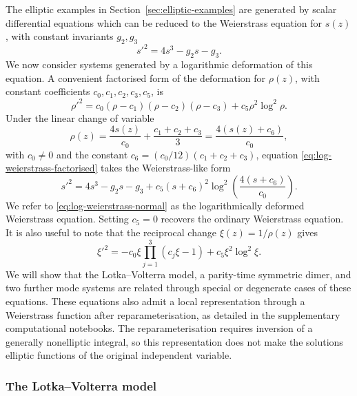 \documentclass[11pt,a4paper]{article}
\numberwithin{equation}{section}
\begin{document}
The elliptic examples in Section~\ref{sec:elliptic-examples} are generated by scalar differential equations which can be reduced to the Weierstrass equation for $s(z)$, with constant invariants $g_2,g_3$
\begin{equation}
    s'^2=4s^3-g_2s-g_3.
\end{equation}
We now consider systems generated by a logarithmic deformation of this equation. A convenient factorised form of the deformation for $\rho(z)$, with constant coefficients $c_0,c_1,c_2,c_3,c_5$, is
\begin{equation}
    \rho'^2
    =
    c_0(\rho-c_1)(\rho-c_2)(\rho-c_3)
    +
    c_5\rho^2\log^2 \rho. \label{eq:log-weierstrass-factorised}
\end{equation}
Under the linear change of variable
\begin{equation}
    \rho(z)=\frac{4s(z)}{c_0}+\frac{c_1+c_2+c_3}{3}
    =\frac{4(s(z)+c_6)}{c_0},
\end{equation}
with $c_0\ne0$ and the constant $c_6=(c_0/12)(c_1+c_2+c_3)$, equation \eqref{eq:log-weierstrass-factorised} takes the Weierstrass-like form
\begin{equation}
    s'^2
    =
    4s^3-g_2s-g_3
    +
    c_5(s+c_6)^2
    \log^2\left(\frac{4(s+c_6)}{c_0}\right). \label{eq:log-weierstrass-normal}
\end{equation}
We refer to \eqref{eq:log-weierstrass-normal} as the logarithmically deformed Weierstrass equation. Setting $c_5=0$ recovers the ordinary Weierstrass equation. It is also useful to note that the reciprocal change $\xi(z)=1/\rho(z)$ gives
\begin{equation}
    \xi'^2
    =
    -c_0\xi\prod_{j=1}^{3}(c_j\xi-1)
    +
    c_5\xi^2\log^2\xi. \label{eq:log-weierstrass-reciprocal}
\end{equation}
We will show that the Lotka--Volterra model, a parity-time symmetric dimer, and two further mode systems are related through special or degenerate cases of these equations. These equations also admit a local representation through a Weierstrass function after reparameterisation, as detailed in the supplementary computational notebooks. The reparameterisation requires inversion of a generally nonelliptic integral, so this representation does not make the solutions elliptic functions of the original independent variable.

\subsubsection{The Lotka--Volterra model}
\end{document}
